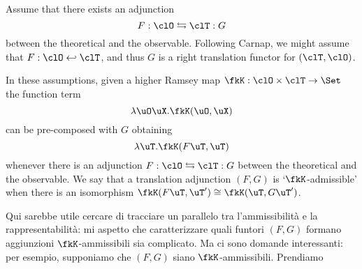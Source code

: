 \begin{remark}\label{carnap_translation_functors}
	Assume that there exists an adjunction 
	\[ 
		F : \clO \leftrightarrows \clT : G
	\]
	between the theoretical and the observable. Following Carnap, we might assume that $F : \clO \hookleftarrow \clT$, and thus $G$ is a right translation functor for $(\clT, \clO)$.

	In these assumptions, given a higher Ramsey map $\fkK : \clO \times \clT \to \Set$ the function term
	\[\lambda \uO\uX . \fkK(\uO, \uX)\]
	can be pre-composed with $G$ obtaining
	\[\lambda \uT.\fkK(F\uT, \uT)\]
	whenever there is an adjunction $F : \clO \leftrightarrows \clT : G$ between the theoretical and the observable. We say that a translation adjunction $(F,G)$ is `$\fkK$-admissible' when there is an isomorphism $\fkK(F\uT,\uT')\cong\fkK(\uT,G\uT')$.


\end{remark}
\color{red}
Qui sarebbe utile cercare di tracciare un parallelo tra l'ammissibilità e la rappresentabilità: mi aspetto che caratterizzare quali funtori $(F,G)$ formano aggiunzioni $\fkK$-ammissibili sia complicato. Ma ci sono domande interessanti: per esempio, supponiamo che $(F,G)$ siano $\fkK$-ammissibili. Prendiamo 
\color{black}